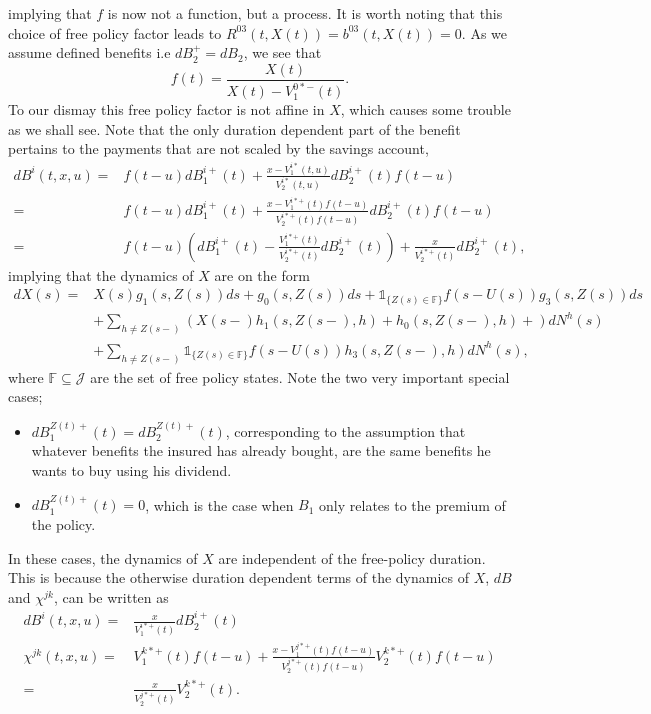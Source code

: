 \documentclass[12pt]{article}
\newcommand{\indic}[1]{\mathds{1}_{ \{ #1 \} }}
\theoremstyle{my_thm}
\begin{document}
implying that $f$ is now not a function, but a process. It is worth noting that this choice of free policy factor leads to $R^{03}(t,X(t))=b^{03}(t,X(t))=0$. As we assume defined benefits i.e $dB_2^+=dB_2$, we see that
$$
f(t)=\frac{X(t)}{X(t)-V_1^{0*-}(t)}.
$$
To our dismay this free policy factor is not affine in $X$, which causes some trouble as we shall see. Note that the only duration dependent part of the benefit pertains to the payments that are not scaled by the savings account,
\begin{align*}
dB^i(t,x,u)=&f(t-u)dB^{i+}_1(t)+\frac{x-V_1^{i*}(t,u)}{V_2^{i*}(t,u)}dB_2^{i+}(t)f(t-u)
\\
=&
f(t-u)dB^{i+}_1(t)+\frac{x-V_1^{i*+}(t)f(t-u)}{V_2^{i*+}(t)f(t-u)}dB_2^{i+}(t)f(t-u)
\\
=&
f(t-u)\left( dB^{i+}_1(t) - \frac{V_1^{i*+}(t)}{V_2^{i*+}(t)}dB_2^{i+}(t) \right)  +\frac{x}{V_2^{i*+}(t)}dB_2^{i+}(t),
\end{align*}
implying that the dynamics of $X$ are on the form
\begin{align}
dX(s)=&X(s)g_1(s,Z(s))ds+g_0(s,Z(s))ds +  \indic{Z(s)\in \mathbb{F}} f(s-U(s)) g_3(s,Z(s))ds \label{eq:AAK} \\
&+
\sum_{h\neq Z(s-)} \left( X(s-)h_1(s,Z(s-),h)+ h_0(s,Z(s-),h) + \right) dN^h(s)
\nonumber \\
&+
\sum_{h\neq Z(s-)}  \indic{Z(s)\in \mathbb{F}} f(s-U(s))h_3(s,Z(s-),h) dN^h(s),
\nonumber
\end{align}
where $\mathbb{F} \subseteq \mathcal{J}$ are the set of free policy states. Note the two very important special cases;
\begin{itemize}
\item $dB_1^{Z(t)+}(t)=dB_2^{Z(t)+}(t)$, corresponding to the assumption that whatever benefits the insured has already bought, are the same benefits he wants to buy using his dividend.
\item $dB_1^{Z(t)+}(t)=0$, which is the case when $B_1$ only relates to the premium of the policy. 
\end{itemize}  In these cases, the dynamics of $X$ are independent of the free-policy duration. This is because the otherwise duration dependent terms of the dynamics of $X$, $dB$ and $\chi^{jk}$, can be written as
\begin{align*}
dB^i(t,x,u)=&\frac{x}{V_1^{i*+}(t)}dB_2^{i+}(t)
\\
\chi^{jk}(t,x,u)=&V_1^{k*+}(t)f(t-u)+\frac{x-V_1^{j*+}(t)f(t-u)}{V_2^{j*+}(t)f(t-u)}V_2^{k*+}(t)f(t-u)
\\
=&
\frac{x}{V_2^{j*+}(t)}V_2^{k*+}(t).
\end{align*}
\end{document}
